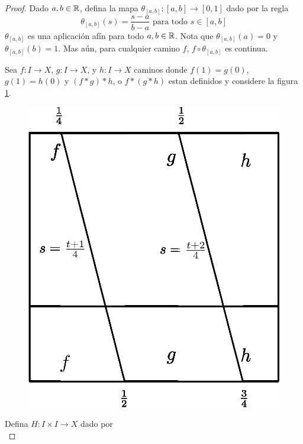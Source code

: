 \begin{proof}
    Dado $a,b \in \mathbb{R}$, defina la mapa $\theta_{[a,b]}:[a,b] \xrightarrow{}
    [0,1]$ dado por la regla
    \begin{equation*}
        \theta_{[a,b]}(s)=\frac{s-a}{b-a} \text{ para todo } s \in [a,b]
    \end{equation*}
    $\theta_{[a,b]}$ es una aplicaci\'on af\'in para todo $a,b \in \mathbb{R}$. Nota que
     $\theta_{[a,b]}(a)=0$ y $\theta_{[a,b]}(b)=1$. Mas a\'un, para cualquier
     camino $f$,  $f \circ \theta_{[a,b]}$ es continua.

     Sea $f:I \xrightarrow{} X$, $g:I \xrightarrow{} X$, y $h:I \xrightarrow{}
     X$ caminos donde $f(1)=g(0)$, $g(1)=h(0)$ y $(f \ast g) \ast h$, o $f \ast
     (g \ast h)$ estan definidos y considere la figura \ref{fig_22}.
     \begin{figure}[h]
         \centering
         \includegraphics[scale=0.5]{Figures/path_associativity.eps}
         \caption{}
         \label{fig_22}
     \end{figure}
     Defina $H:I \times I \xrightarrow{} X$ dado por
     \begin{equation*}

\end{equation*}
\end{proof}
